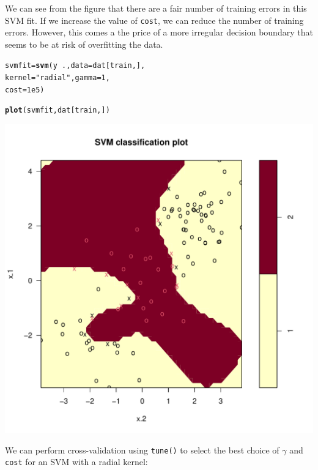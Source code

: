 \documentclass[12pt]{article}\usepackage[]{graphicx}\usepackage[]{color}
\makeatletter
\def\maxwidth{ %
  \ifdim\Gin@nat@width>\linewidth
    \linewidth
  \else
    \Gin@nat@width
  \fi
}
\newcommand{\hlnum}[1]{\textcolor[rgb]{0.686,0.059,0.569}{#1}}%
\newcommand{\hlstr}[1]{\textcolor[rgb]{0.192,0.494,0.8}{#1}}%
\newcommand{\hlopt}[1]{\textcolor[rgb]{0,0,0}{#1}}%
\newcommand{\hlstd}[1]{\textcolor[rgb]{0.345,0.345,0.345}{#1}}%
\newcommand{\hlkwb}[1]{\textcolor[rgb]{0.69,0.353,0.396}{#1}}%
\newcommand{\hlkwc}[1]{\textcolor[rgb]{0.333,0.667,0.333}{#1}}%
\newcommand{\hlkwd}[1]{\textcolor[rgb]{0.737,0.353,0.396}{\textbf{#1}}}%
\newenvironment{kframe}{%
 \def\at@end@of@kframe{}%
 \ifinner\ifhmode%
  \def\at@end@of@kframe{\end{minipage}}%
  \begin{minipage}{\columnwidth}%
 \fi\fi%
 \def\FrameCommand##1{\hskip\@totalleftmargin \hskip-\fboxsep
 \colorbox{shadecolor}{##1}\hskip-\fboxsep
     \hskip-\linewidth \hskip-\@totalleftmargin \hskip\columnwidth}%
 \MakeFramed {\advance\hsize-\width
   \@totalleftmargin\z@ \linewidth\hsize
   \@setminipage}}%
 {\par\unskip\endMakeFramed%
 \at@end@of@kframe}
\newenvironment{knitrout}{}{} %
\makeatother
\begin{document}
We can see from the figure that there are a fair number of training errors in this SVM fit. If we increase the value of \texttt{cost}, we can reduce the number of training errors. However, this comes a the price of a more irregular decision boundary that seems to be at risk of overfitting the data.

\begin{knitrout}
\color{fgcolor}\begin{kframe}
\begin{alltt}
\hlstd{svmfit}\hlkwb{=}\hlkwd{svm}\hlstd{(y}\hlopt{~}\hlstd{.,} \hlkwc{data}\hlstd{=dat[train,],}
           \hlkwc{kernel}\hlstd{=}\hlstr{"radial"}\hlstd{,}\hlkwc{gamma}\hlstd{=}\hlnum{1}\hlstd{,}
           \hlkwc{cost}\hlstd{=}\hlnum{1e5}\hlstd{)}

\hlkwd{plot}\hlstd{(svmfit, dat[train,])}
\end{alltt}
\end{kframe}
\includegraphics[width=\maxwidth]{figure/unnamed-chunk-21-1} 

\end{knitrout}

We can perform cross-validation using \texttt{tune()} to select the best choice of $\gamma$ and \texttt{cost} for an SVM with a radial kernel:
\end{document}
